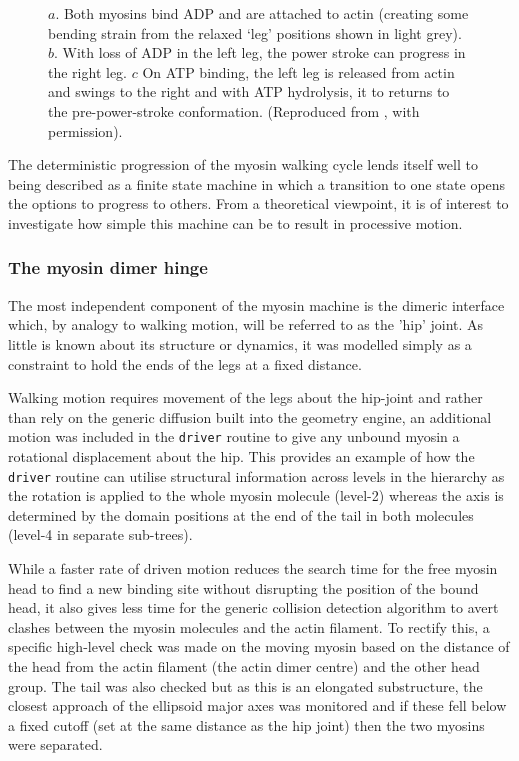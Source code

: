 \begin{figure}
\centering
\epsfxsize=200pt 
\caption{
\label{Fig:cycle}
$a$. Both myosins bind ADP and are attached to actin (creating some bending strain from the relaxed
`leg' positions shown in light grey). $b$. With loss of ADP in the left leg, the power stroke can
progress in the right leg.  $c$  On ATP binding, the left leg is released from actin and swings to the
right and with ATP hydrolysis, it to returns to the pre-power-stroke conformation.
(Reproduced from , with permission).
}
\end{figure}



The deterministic progression of the myosin walking cycle lends itself
well to being described as a finite state machine in which a transition to
one state opens the options to progress to others.   From a theoretical
viewpoint, it is of interest to investigate how simple this machine can
be to result in processive motion.

\subsubsection{The myosin dimer hinge}

The most independent component of the myosin machine is the dimeric
interface which, by analogy to walking motion, will be referred to as the
'hip' joint.   As little is known about its structure or dynamics, it
was modelled simply as a constraint to hold the ends of the legs at a
fixed distance.

Walking motion requires movement of the legs about the hip-joint and 
rather than rely on the generic diffusion built into the geometry
engine, an additional motion was included in the {\tt driver} routine
to give any unbound myosin a rotational displacement about the hip.
This provides an example of how the {\tt driver} routine can utilise
structural information across levels in the hierarchy as the rotation
is applied to the whole myosin molecule (level-2) whereas the axis
is determined by the domain positions at the end of the tail in 
both molecules (level-4 in separate sub-trees).

While a faster rate of driven motion reduces the search time for the
free myosin head to find a new binding site without disrupting the
position of the bound head, it also gives less time for the generic
collision detection algorithm to avert clashes between the myosin molecules
and the actin filament.  To rectify this, a specific high-level check
was made on the moving myosin based on the distance of the head from the actin
filament (the actin dimer centre) and the other head group.  The tail was
also checked but as this is an elongated substructure, the closest 
approach of the ellipsoid major axes was monitored and if these fell
below a fixed cutoff (set at the same distance as the hip joint) then
the two myosins were separated.


